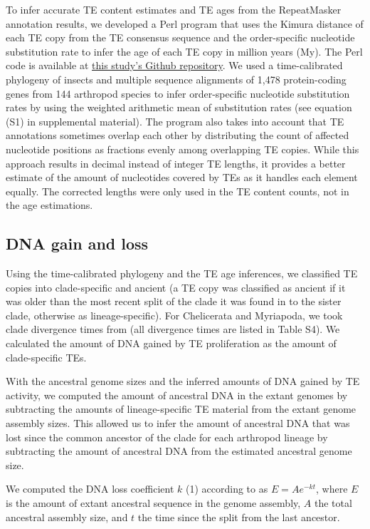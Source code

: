 To infer accurate TE content estimates and TE ages from the RepeatMasker
annotation results, we developed a Perl program that uses the Kimura
distance of each TE copy from the TE consensus sequence and the
order-specific nucleotide substitution rate to infer the age of each TE
copy in million years (My). The Perl code is available at
\href{https://github.com/mptrsen/dynamics-of-genome-size}{this study's
Github repository}. We used a time-calibrated phylogeny of insects
\citep{Misof2014} and multiple sequence alignments of 1,478
protein-coding genes from 144 arthropod species \citep{Misof2014} to
infer order-specific nucleotide substitution rates by using the weighted
arithmetic mean of substitution rates (see equation (S1) in supplemental
material). The program also takes into account that TE annotations
sometimes overlap each other by distributing the count of affected
nucleotide positions as fractions evenly among overlapping TE copies.
While this approach results in decimal instead of integer TE lengths, it
provides a better estimate of the amount of nucleotides covered by TEs
as it handles each element equally. The corrected lengths were only used
in the TE content counts, not in the age estimations.

\subsection*{DNA gain and loss}\label{dna-gain-and-loss}

Using the time-calibrated phylogeny and the TE age inferences, we
classified TE copies into clade-specific and ancient (a TE copy was
classified as ancient if it was older than the most recent split of the
clade it was found in to the sister clade, otherwise as
lineage-specific). For Chelicerata and Myriapoda, we took clade
divergence times from \citet{Misof2014} (all divergence times are
listed in Table S4). We calculated the amount of DNA gained by TE
proliferation as the amount of clade-specific TEs.

With the ancestral genome sizes and the inferred amounts of DNA gained
by TE activity, we computed the amount of ancestral DNA in the extant
genomes by subtracting the amounts of lineage-specific TE material from
the extant genome assembly sizes. This allowed us to infer the amount of
ancestral DNA that was lost since the common ancestor of the clade for
each arthropod lineage by subtracting the amount of ancestral DNA from
the estimated ancestral genome size.

We computed the DNA loss coefficient \(k\) (1) according to
\citet{Lindblad-Toh2005} as \(E = A e^{-kt}\), where \(E\) is
the amount of extant ancestral sequence in the genome assembly,
\(A\) the total ancestral assembly size, and
\(t\) the time since the split from the last ancestor.

